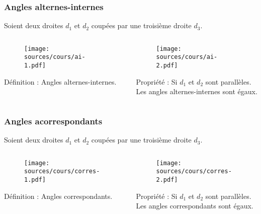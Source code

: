 \documentclass{beamer}
\begin{document}
\frame{\tableofcontents[sectionstyle=show/shaded, subsectionstyle=show/shaded]}

\begin{frame}
  \frametitle{Angles alternes-internes}
  Soient deux droites $d_1$ et $d_2$ coupées par une troisième droite $d_3$.
  \begin{columns}[t]
    \begin{column}{5cm}
      \begin{figure}[H]
        \centering
        \texttt{[image: sources/cours/ai-1.pdf]}
      \end{figure}
      \begin{block}{Définition :}	
        Angles alternes-internes.
      \end{block}   

    \end{column}
    \begin{column}{5cm}
      \begin{figure}[H]
        \centering
        \texttt{[image: sources/cours/ai-2.pdf]}
      \end{figure}
      \begin{block}{Propriété :}	
        Si $d_1$ et $d_2$ sont \alert{parallèles}.\\
        Les angles alternes-internes sont \alert{égaux}.
      \end{block}   
    \end{column}
  \end{columns}    
\end{frame}

\begin{frame}
  \frametitle{Angles acorrespondants}
  Soient deux droites $d_1$ et $d_2$ coupées par une troisième droite $d_3$.
  \begin{columns}[t]
    \begin{column}{5cm}
      \begin{figure}[H]
        \centering
        \texttt{[image: sources/cours/corres-1.pdf]}
      \end{figure}
      \begin{block}{Définition :}	
        Angles correspondants.
      \end{block}   

    \end{column}
    \begin{column}{5cm}
      \begin{figure}[H]
        \centering
        \texttt{[image: sources/cours/corres-2.pdf]}
      \end{figure}
      \begin{block}{Propriété :}	
        Si $d_1$ et $d_2$ sont \alert{parallèles}.\\
        Les angles correspondants sont \alert{égaux}.
      \end{block}   
    \end{column}
  \end{columns}    
\end{frame}
\end{document}
